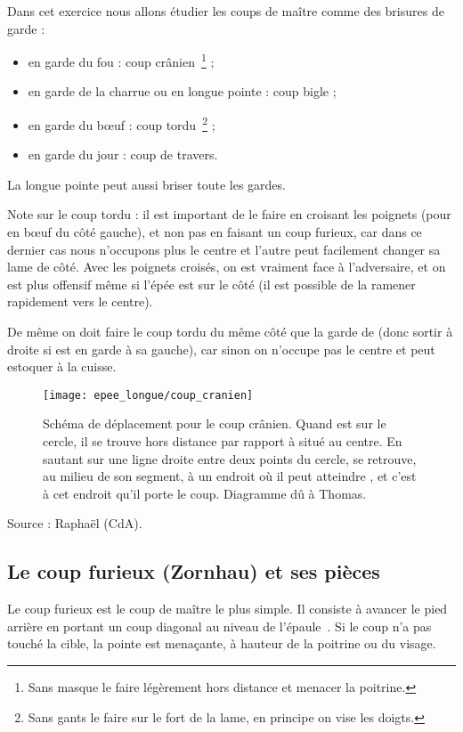 \begin{exercice}
Dans cet exercice nous allons étudier les coups de maître comme des brisures de garde :
\begin{itemize}
	\item \D en garde du fou : coup crânien~\footnote{Sans masque le faire légèrement hors distance et menacer la poitrine.} ;
	\item \D en garde de la charrue ou en longue pointe : coup bigle ;
	\item \D en garde du bœuf : coup tordu~\footnote{Sans gants le faire sur le fort de la lame, en principe on vise les doigts.} ;
	\item \D en garde du jour : coup de travers.
\end{itemize}
La longue pointe peut aussi briser toute les gardes.

Note sur le coup tordu : il est important de le faire en croisant les poignets (pour \D en bœuf du côté gauche), et non pas en faisant un coup furieux, car dans ce dernier cas nous n'occupons plus le centre et l'autre peut facilement changer sa lame de côté. Avec les poignets croisés, on est vraiment face à l'adversaire, et on est plus offensif même si l'épée est sur le côté (il est possible de la ramener rapidement vers le centre).

De même on doit faire le coup tordu du même côté que la garde de \D (donc sortir à droite si \D est en garde à sa gauche), car sinon on n'occupe pas le centre et \D peut estoquer à la cuisse.

\begin{figure}[ht]
	\centering
	\texttt{[image: epee\_longue/coup\_cranien]}
	\caption{Schéma de déplacement pour le coup crânien. Quand \A est sur le cercle, il se trouve hors distance par rapport à \D situé au centre. En sautant sur une ligne droite entre deux points du cercle, \A se retrouve, au milieu de son segment, à un endroit où il peut atteindre \D, et c'est à cet endroit qu'il porte le coup. Diagramme dû à Thomas.}
\end{figure}

Source : Raphaël (CdA).
\end{exercice}

\subsection{Le coup furieux (Zornhau) et ses pièces}

\begin{coup}
Le coup furieux est le coup de maître le plus simple.
Il consiste à avancer le pied arrière en portant un coup diagonal au niveau de l'épaule~\cite[fol.~19r-20v, p.~16]{farrell:ringeck}.
Si le coup n'a pas touché la cible, la pointe est menaçante, à hauteur de la poitrine ou du visage.
\end{coup}

